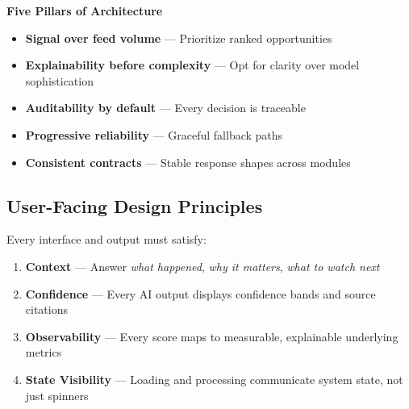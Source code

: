 \documentclass[11pt,a4paper]{article}
\begin{document}
\begin{tcolorbox}[colback=mn-light, colframe=mn-navy, arc=2mm, boxsep=10pt]
\textbf{\color{mn-navy}Five Pillars of Architecture}

\vspace{0.5cm}

\begin{minipage}[t]{0.48\linewidth}
\small
\begin{itemize}[label={\textcolor{mn-blue}{\facheck}}, leftmargin=1.2cm]
    \item \textbf{Signal over feed volume} — Prioritize ranked opportunities
    \item \textbf{Explainability before complexity} — Opt for clarity over model sophistication
    \item \textbf{Auditability by default} — Every decision is traceable
\end{itemize}
\end{minipage}
\hfill
\begin{minipage}[t]{0.48\linewidth}
\small
\begin{itemize}[label={\textcolor{mn-blue}{\facheck}}, leftmargin=1.2cm]
    \item \textbf{Progressive reliability} — Graceful fallback paths
    \item \textbf{Consistent contracts} — Stable response shapes across modules
\end{itemize}
\end{minipage}

\end{tcolorbox}

\subsection{User-Facing Design Principles}

Every interface and output must satisfy:

\begin{enumerate}[label={\color{mn-success}(\arabic*)}, leftmargin=1.8cm]
    \item \textbf{Context} — Answer \textit{what happened}, \textit{why it matters}, \textit{what to watch next}
    \item \textbf{Confidence} — Every AI output displays confidence bands and source citations
    \item \textbf{Observability} — Every score maps to measurable, explainable underlying metrics
    \item \textbf{State Visibility} — Loading and processing communicate system state, not just spinners
\end{enumerate}
\end{document}
